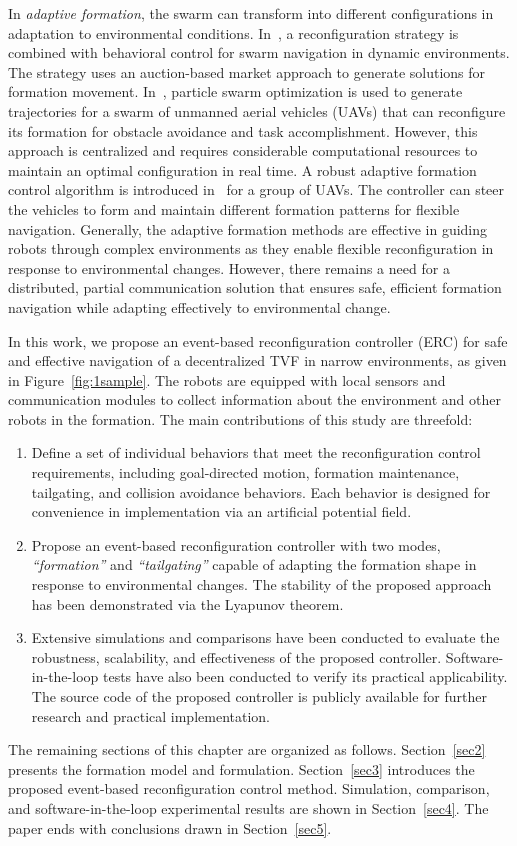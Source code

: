 In \textit{adaptive formation}, the swarm can transform into different configurations in adaptation to environmental conditions. In~\cite{Fu2020}, a reconfiguration strategy is combined with behavioral control for swarm navigation in dynamic environments. The strategy uses an auction-based market approach to generate solutions for formation movement. In~\cite{8843165}, particle swarm optimization is used to generate trajectories for a swarm of unmanned aerial vehicles (UAVs) that can reconfigure its formation for obstacle avoidance and task accomplishment. However, this approach is centralized and requires considerable computational resources to maintain an optimal configuration in real time. A robust adaptive formation control algorithm is introduced in~\cite{Mung2019} for a group of UAVs. The controller can steer the vehicles to form and maintain different formation patterns for flexible navigation. Generally, the adaptive formation methods are effective in guiding robots through complex environments as they enable flexible reconfiguration in response to environmental changes. However, there remains a need for a distributed, partial communication solution that ensures safe, efficient formation navigation while adapting effectively to environmental change.

In this work, we propose an event-based reconfiguration controller (ERC) for safe and effective navigation of a decentralized TVF in narrow environments, as given in Figure~\ref{fig:1sample}. The robots are equipped with local sensors and communication modules to collect information about the environment and other robots in the formation. The main contributions of this study are threefold:
\begin{enumerate}
    \item Define a set of individual behaviors that meet the reconfiguration control requirements, including goal-directed motion, formation maintenance, tailgating, and collision avoidance behaviors. Each behavior is designed for convenience in implementation via an artificial potential field.
        \item Propose an event-based reconfiguration controller with two modes, \textit{``formation''} and \textit{``tailgating''} capable of adapting the formation shape in response to environmental changes. The stability of the proposed approach has been demonstrated via the Lyapunov theorem.
    \item Extensive simulations and comparisons have been conducted to evaluate the robustness, scalability, and effectiveness of the proposed controller. Software-in-the-loop tests have also been conducted to verify its practical applicability. The source code of the proposed controller is publicly available for further research and practical implementation.
\end{enumerate}

The remaining sections of this chapter are organized as follows. Section~\ref{sec2} presents the formation model and formulation. Section~\ref{sec3} introduces the proposed event-based reconfiguration control method. Simulation, comparison, and software-in-the-loop experimental results are shown in Section~\ref{sec4}. The paper ends with conclusions drawn in Section~\ref{sec5}.